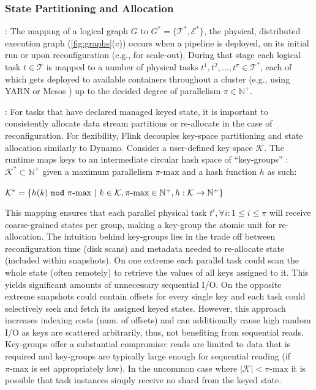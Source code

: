 \subsubsection{State Partitioning and Allocation}

: The mapping of a logical graph $G$ to $G^* = \{\mathcal{T^*}, \mathcal{E^*}\}$, the physical, distributed execution graph (\autoref{fig:graphs}(c)) occurs when a pipeline is deployed, on its initial run or upon reconfiguration (e.g., for scale-out). During that stage each logical task $t \in \mathcal{T}$ is mapped to a number of physical tasks $t^1, t^2, \ldots, t^\pi \in \mathcal{T^*}$, each of which gets deployed to available containers throughout a cluster (e.g., using YARN \cite{vavilapalli2013apache} or Mesos \cite{hindman2011mesos}) up to the decided degree of parallelism $\pi \in \mathbb{N^+}$. 

: For tasks that have declared managed keyed state, it is important to consistently allocate data stream partitions or re-allocate in the case of reconfiguration. For flexibility, Flink decouples key-space partitioning and state allocation similarly to Dynamo\cite{decandia2007dynamo}. Consider a user-defined key space $\mathcal{K}$. The runtime maps keys to an intermediate circular hash space of ``key-groups'' : $\mathcal{K}^* \subset \mathbb{N^+}$ given a maximum parallelism $\pi\text{-max}$ and a hash function $h$ as such:

\noindent $\mathcal{K}^* = \{ h(k)\text{ \texttt{mod} }\pi\text{-max}\text{ }|\text{ }k \in \mathcal{K}, \pi\text{-max} \in \mathbb{N^+}, h: \mathcal{K} \rightarrow \mathbb{N^+} \}$

\noindent This mapping ensures that each parallel physical task $t^i , \forall i : 1 \leq i \leq \pi$ will receive coarse-grained states per group, making a key-group the atomic unit for re-allocation. The intuition behind key-groups lies in the trade off between reconfiguration time (disk scans) and metadata needed to re-allocate state (included within snapshots). On one extreme each parallel task could scan the whole state (often remotely) to retrieve the values of all keys assigned to it. This yields significant amounts of unnecessary sequential I/O. On the opposite extreme snapshots could contain offsets for every single key and each task could selectively seek and fetch its assigned keyed states. However, this approach increases indexing costs (num. of offsets) and can additionally cause high random I/O as keys are scattered arbitrarily, thus, not benefiting from sequential reads. Key-groups offer a substantial compromise: reads are limited to data that is required and key-groups are typically large enough for sequential reading (if $\pi\text{-max}$ is set appropriately low). In the uncommon case where $|\mathcal{K}| < \pi\text{-max}$ it is possible that task instances simply receive no shard from the keyed state.

